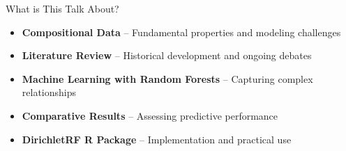 \begin{frame}{What is This Talk About?}



\vspace{2em}



\vspace{1.5em}

\begin{itemize}

  \item[\textcolor{blue}{\large$\blacktriangleright$}] \textbf{Compositional Data} -- Fundamental properties and modeling challenges
  \vspace{1em}

  \item[\textcolor{blue}{\large$\blacktriangleright$}] \textbf{Literature Review} -- Historical development and ongoing debates
  \vspace{1em}

  \item[\textcolor{blue}{\large$\blacktriangleright$}] \textbf{Machine Learning with Random Forests} -- Capturing complex relationships
  \vspace{1em}


  \item[\textcolor{blue}{\large$\blacktriangleright$}] \textbf{Comparative Results} -- Assessing predictive performance
  \vspace{1em}

  \item[\textcolor{blue}{\large$\blacktriangleright$}] \textbf{DirichletRF R Package} -- Implementation and practical use

\end{itemize}

\vspace{2em}

\end{frame}


